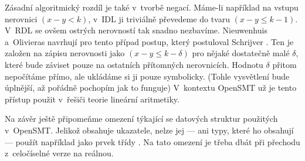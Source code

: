Zásadní algoritmický rozdíl je také v~tvorbě negací. Máme-li například na vstupu nerovnici $(x-y<k)$, v~IDL ji triviálně převedeme do tvaru $(x-y\leq k-1)$. V~RDL se ovšem ostrých nerovností tak snadno nezbavíme. Nieuwenhuis a~Olivieras \cite{Nieuwenhuis05} navrhují pro tento případ postup, který postuloval Schrijver \cite{Schrijver86}. Ten je založen na zápisu nerovnosti jako $(x-y\leq k-\delta)$ pro nějaké dostatečně malé $\delta$, které bude záviset pouze na ostatních přítomných nerovnicích. Hodnotu $\delta$ přitom nepočítáme přímo, ale ukládáme si ji pouze symbolicky. (Tohle vysvětlení bude úplnější, až pořádně pochopím jak to funguje) %
V~kontextu OpenSMT už je tento přístup použit v~řešiči teorie lineární aritmetiky.

Na závěr ještě připomeňme omezení týkající se datových struktur použitých v~OpenSMT. Jelikož  obsahuje ukazatele, nelze jej --- ani typy, které ho obsahují --- použít například jako prvek třídy . Na tato omezení je třeba dbát při přechodu z~celočíselné verze na reálnou.


